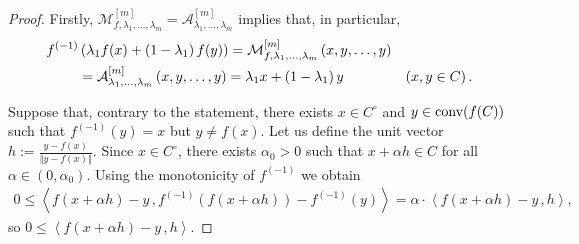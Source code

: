\documentclass[12pt]{amsart}
\theoremstyle{remark}
\theoremstyle{definition}
\newcommand{\nma}{\Vert}
\newcommand{\conv}{\mbox{\rm conv}}
\newcommand{\bsz}[2]{\left \langle #1 \,, #2 \right \rangle}
\begin{document}
\begin{proof} 
Firstly, $ \mathcal{M}_{f, \lambda_1 , \dots , \lambda_m}^{[m]} 
= \mathcal{A}_{\lambda_1 , \dots , \lambda_m}^{[m]} $ 
implies that, in particular, 
\begin{equation}\label{eq-prop_Appl_2mean}
\begin{aligned}
f^{(-1)} & \left( \lambda_1 f(x) + 
\left( 1-\lambda_1 \right) f(y) \right) = 
\mathcal{M}_{f, \lambda_1 , \dots , \lambda_m}^{[m]} 
\left( x,y, \dots , y \right) \\ 
& = \mathcal{A}_{\lambda_1 , \dots , \lambda_m}^{[m]} 
\left( x,y, \dots , y \right) = 
\lambda_1 x + \left( 1- \lambda_1 \right) y 
\hspace{15mm} 
\left( x,y \in C \right). 
\end{aligned} 
\end{equation}

Suppose that, contrary to the statement, 
there exists $ x \in C^{\circ} $ and 
$ y \in \conv(f(C)) $ such 
that $ f^{(-1)}(y) = x $ but $ y \neq f(x) $. 
Let us define the unit vector 
$ h := \frac{y-f(x)}{\nma y-f(x) \nma} $. 
Since $ x \in C^{\circ} $, there exists 
$ \alpha_0 > 0 $ such that 
$ x + \alpha h \in C $ for all 
$ \alpha \in (0,\alpha_0) $. Using the monotonicity 
of $ f^{(-1)} $ we obtain 
\begin{align*}
0 \leq  
\bsz	{f(x + \alpha h) - y}{ 
f^{(-1)} \left( f(x + \alpha h) \right) - f^{(-1)}(y) } 
= \alpha \cdot \bsz{f(x + \alpha h) - y}{h}, 
\end{align*}
so $ 0 \leq \bsz{f(x + \alpha h) - y}{h} $. 


\end{proof}
\end{document}
